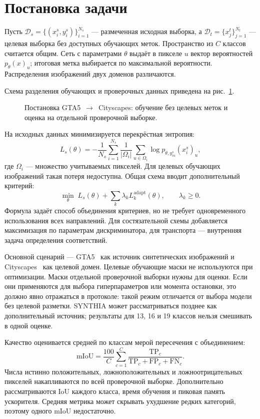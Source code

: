 \section{Постановка задачи}
Пусть $\mathcal D_s=\{(x_i^s,y_i^s)\}_{i=1}^{N_s}$ --- размеченная исходная выборка, а $\mathcal D_t=\{x_j^t\}_{j=1}^{N_t}$ --- целевая выборка без доступных обучающих меток. Пространство из $C$ классов считается общим. Сеть с параметрами $\theta$ выдаёт в пикселе $u$ вектор вероятностей $p_\theta(x)_u$; итоговая метка выбирается по максимальной вероятности. Распределения изображений двух доменов различаются.

Схема разделения обучающих и проверочных данных приведена на рис.~\ref{fig:uda-protocol}.

\begin{figure}[htbp]
\centering

\caption{Постановка GTA5~$\rightarrow$~Cityscapes: обучение без целевых меток и оценка на отдельной проверочной выборке.}
\label{fig:uda-protocol}
\end{figure}

На исходных данных минимизируется перекрёстная энтропия:
\begin{equation}
 L_s(\theta)=-\frac1{N_s}\sum_{i=1}^{N_s}\frac1{|\Omega_i|}
 \sum_{u\in\Omega_i}\log p_{\theta,y^s_{iu}}(x_i^s)_u,
 \label{eq:source}
\end{equation}
где $\Omega_i$ --- множество учитываемых пикселей. Для целевых обучающих изображений такая потеря недоступна. Общая схема вводит дополнительный критерий:
\begin{equation}
 \min_\theta\; L_s(\theta)+\sum_k\lambda_k L_k^{\mathrm{adapt}}(\theta),
 \qquad\lambda_k\geq0.
 \label{eq:total}
\end{equation}
Формула задаёт способ объединения критериев, но не требует одновременного использования всех направлений. Для состязательной схемы добавляется максимизация по параметрам дискриминатора, для транспорта --- внутренняя задача определения соответствий.

Основной сценарий --- GTA5~\cite{gta} как источник синтетических изображений и Cityscapes~\cite{cityscapes} как целевой домен. Целевые обучающие маски не используются при оптимизации. Маски отдельной проверочной выборки нужны для оценки. Если они применяются для выбора гиперпараметров или момента остановки, это должно явно отражаться в протоколе: такой режим отличается от выбора модели без целевой разметки. SYNTHIA может рассматриваться позднее как дополнительный источник; результаты для 13, 16 и 19 классов нельзя смешивать в одной оценке.

Качество оценивается средней по классам мерой пересечения с объединением:
\begin{equation}
 \mathrm{mIoU}=\frac{100}{C}\sum_{c=1}^{C}
 \frac{\mathrm{TP}_c}{\mathrm{TP}_c+\mathrm{FP}_c+\mathrm{FN}_c}.
 \label{eq:miou}
\end{equation}
Числа истинно положительных, ложноположительных и ложноотрицательных пикселей накапливаются по всей проверочной выборке. Дополнительно рассматриваются IoU каждого класса, время обучения и пиковая память ускорителя. Средняя метрика может скрывать ухудшение редких категорий, поэтому одного mIoU недостаточно.
